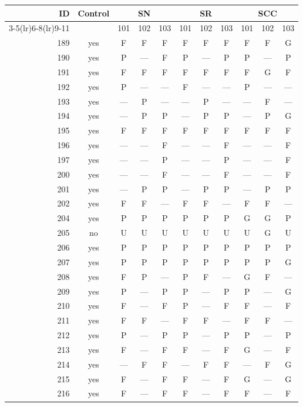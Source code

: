 \begin{table}[p]\centering\small
\begin{tabular*}{\textwidth}{@{\extracolsep{\fill}}rc*{9}{c}@{}}\toprule
ID & Control & \multicolumn{3}{c}{SN} & \multicolumn{3}{c}{SR} & \multicolumn{3}{c}{SCC}\\
\cmidrule(lr){3-5}\cmidrule(lr){6-8}\cmidrule(lr){9-11}
 & & 101 & 102 & 103 & 101 & 102 & 103 & 101 & 102 & 103\\\midrule
189 & yes & F & F & F & F & F & F & F & F & G\\
190 & yes & P & — & F & P & — & P & P & — & P\\
191 & yes & F & F & F & F & F & F & F & G & F\\
192 & yes & P & — & — & F & — & — & P & — & —\\
193 & yes & — & P & — & — & P & — & — & F & —\\
194 & yes & — & P & P & — & P & P & — & P & G\\
195 & yes & F & F & F & F & F & F & F & F & F\\
196 & yes & — & — & F & — & — & F & — & — & F\\
197 & yes & — & — & P & — & — & P & — & — & F\\
200 & yes & — & — & F & — & — & F & — & — & F\\
201 & yes & — & P & P & — & P & P & — & P & P\\
202 & yes & F & F & — & F & F & — & F & F & —\\
204 & yes & P & P & P & P & P & P & G & G & P\\
205 & no & U & U & U & U & U & U & U & G & U\\
206 & yes & P & P & P & P & P & P & P & P & P\\
207 & yes & P & P & P & P & P & P & P & P & G\\
208 & yes & F & P & — & P & F & — & G & F & —\\
209 & yes & P & — & P & P & — & P & P & — & G\\
210 & yes & F & — & F & P & — & F & F & — & F\\
211 & yes & F & F & — & F & F & — & F & F & —\\
212 & yes & P & — & P & P & — & P & P & — & P\\
213 & yes & F & — & F & F & — & F & G & — & F\\
214 & yes & — & F & F & — & F & F & — & F & G\\
215 & yes & F & — & F & F & — & F & G & — & G\\
216 & yes & F & — & F & F & — & F & F & — & F\\

\end{tabular*}
\end{table}
